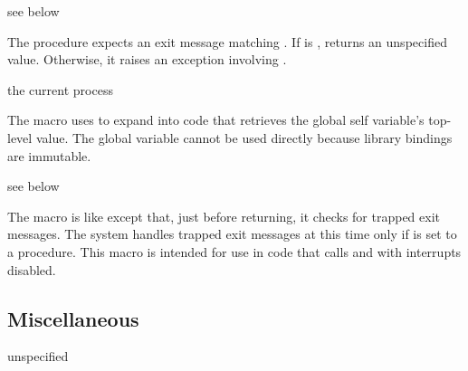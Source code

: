 \begin{procedure}
\end{procedure}
\returns{} see below

The  procedure expects an exit message 
matching .
If  is ,  returns
an unspecified value.
Otherwise, it raises an exception involving .

\begin{syntax}
\end{syntax}
\returns{} the current process

The  macro uses  to expand into
code that retrieves the global self variable's top-level value. The
global variable cannot be used directly because library bindings are
immutable.

\begin{syntax}
\end{syntax}
\expandsto{} see below

The  macro is like
 except that, just before returning, it checks
for trapped exit messages.
The system handles trapped exit messages at this time only if
 is set to a procedure.
This macro is intended for use in code that calls  and
 with interrupts disabled.

\subsection{Miscellaneous}

\begin{procedure}
\end{procedure}
\returns{} unspecified

